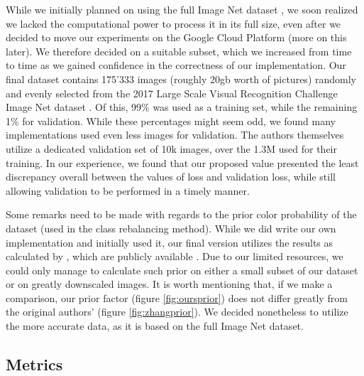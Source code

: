 \documentclass[twoside,twocolumn]{article}
\begin{document}
While we initially planned on using the full Image Net dataset \cite{Imagenet}, we soon realized we lacked the computational power to process it in its full size, even after we decided to move our experiments on the Google Cloud Platform \cite{GCP} (more on this later). We therefore decided on a suitable subset, which we increased from time to time as we gained confidence in the correctness of our implementation. Our final dataset contains 175’333 images (roughly 20gb worth of pictures) randomly and evenly selected from the 2017 Large Scale Visual Recognition Challenge Image Net dataset \cite{ImNetChallenge:2017}. Of this, 99\% was used as a training set, while the remaining 1\% for validation. While these percentages might seem odd, we found many implementations used even less images for validation. The authors \cite{Zhang:2016} themselves utilize a dedicated validation set of 10k images, over the 1.3M used for their training. In our experience, we found that our proposed value presented the least discrepancy overall between the values of loss and validation loss, while still allowing validation to be performed in a timely manner.


Some remarks need to be made with regards to the prior color probability of the dataset (used in the class rebalancing method). While we did write our own implementation and initially used it, our final version utilizes the results as calculated by \cite{Zhang:2016}, which are publicly available \cite{Zhang:github}. Due to our limited resources, we could only manage to calculate such prior on either a small subset of our dataset or on greatly downscaled images. It is worth mentioning that, if we make a comparison, our prior factor (figure \ref{fig:oursprior}) does not differ greatly from the original authors’ (figure \ref{fig:zhangprior}). We decided nonetheless to utilize the more accurate data, as it is based on the full Image Net dataset.




\subsection{Metrics}
\end{document}
